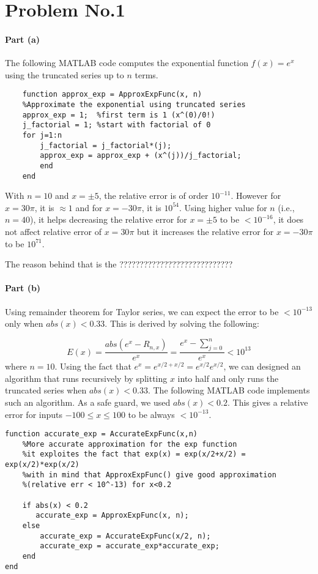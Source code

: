 \section*{Problem No.1} \label{sec:prob1}

\paragraph{Part (a)} 
The following MATLAB code computes the exponential function $f(x)=e^x$ using the truncated series up to $n$ terms. 
\begin{lstlisting}
	function approx_exp = ApproxExpFunc(x, n)
    %Approximate the exponential using truncated series    
    approx_exp = 1;  %first term is 1 (x^(0)/0!)
    j_factorial = 1; %start with factorial of 0
    for j=1:n
        j_factorial = j_factorial*(j);
        approx_exp = approx_exp + (x^(j))/j_factorial;    
    	end
	end
\end{lstlisting}

With $n=10$ and $x=\pm 5$, the relative error is of order $10^{-11}$. However for $x= 30\pi$, it is $\approx 1$ and for $x=-30\pi$, it is $10^{54}$. Using higher value for $n$ (i.e., $n=40$), it helps decreasing the relative error for $x=\pm 5$ to be $ <10^{-16}$, it does not affect relative error of  $x= 30\pi$ but it increases the relative error for  $x=-30\pi$ to be $10^{71}$. 
 
The reason behind that is the ????????????????????????????

\paragraph{Part (b)} Using remainder theorem for Taylor series, we can expect the error to be $<10^{-13}$ only when $abs(x) < 0.33$. This is derived by solving the following:

$$
E(x) = \frac{ abs(e^x - R_{n,x})}{e^x} = \frac{e^x - \sum_{j=0}^{n}}{e^x} <10^{13}
$$
where $n=10$. Using the fact that $e^{x} = e^{x/2 + x/2}=e^{x/2}  e^{x/2}$, we can designed an algorithm that runs recursively by splitting $x$ into half and only runs the truncated series when $abs(x) < 0.33$. The following MATLAB code implements such an algorithm. As a safe guard, we used $abs(x)<0.2$. This gives a relative error for inputs $-100 \leq x  \leq 100$ to be always $<10^{-13}$.

\begin{lstlisting}
function accurate_exp = AccurateExpFunc(x,n)
    %More accurate approximation for the exp function
    %it exploites the fact that exp(x) = exp(x/2+x/2) = exp(x/2)*exp(x/2)
    %with in mind that ApproxExpFunc() give good approximation 
    %(relative err < 10^-13) for x<0.2
    
    if abs(x) < 0.2
       accurate_exp = ApproxExpFunc(x, n);
    else 
        accurate_exp = AccurateExpFunc(x/2, n);
        accurate_exp = accurate_exp*accurate_exp;
    end
end
\end{lstlisting}


